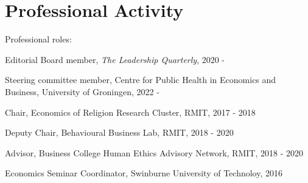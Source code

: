 \documentclass[letterpaper]{article}
\renewenvironment{itemize}{
  \begin{list}{}{
    \setlength{\leftmargin}{1.5em}
  }
}{
  \end{list}
}
\begin{document}
\section*{Professional Activity}
\begin{itemize}
	
		\item Professional roles:
	\begin{itemize}
			\item Editorial Board member, \textit{The Leadership Quarterly}, 2020 -
			\item Steering committee member, Centre for Public Health in Economics and Business, University of Groningen, 2022 -
		\item Chair, Economics of Religion Research Cluster, RMIT, 2017 - 2018
		\item  Deputy Chair, Behavioural Business Lab, RMIT, 2018 - 2020
		\item Advisor, Business College Human Ethics Advisory Network, RMIT, 2018 - 2020
		\item Economics Seminar Coordinator, Swinburne University of Technoloy, 2016
	\end{itemize}



\end{itemize}
\end{document}
